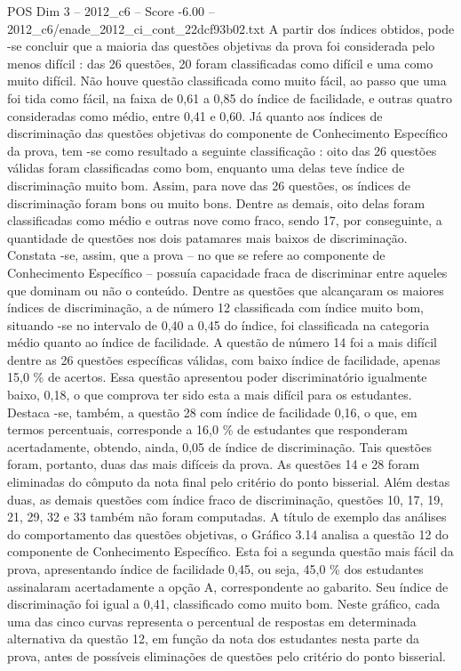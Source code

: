 \begin{textsample}{POS Dim 3 – 2012\_c6 – Score -6.00 – 2012\_c6/enade\_2012\_ci\_cont\_22dcf93b02.txt}
A partir dos índices obtidos, pode -se concluir que a maioria das questões objetivas da prova foi considerada pelo menos difícil : das 26 questões, 20 foram classificadas como difícil e uma como muito difícil.
Não houve questão classificada como muito fácil, ao passo que uma foi tida como fácil, na faixa de 0,61 a 0,85 do índice de facilidade, e outras quatro consideradas como médio, entre 0,41 e 0,60.
Já quanto aos índices de discriminação das questões objetivas do componente de Conhecimento Específico da prova, tem -se como resultado a seguinte classificação : oito das 26 questões válidas foram classificadas como bom, enquanto uma delas teve índice de discriminação muito bom.
Assim, para nove das 26 questões, os índices de discriminação foram bons ou muito bons.
Dentre as demais, oito delas foram classificadas como médio e outras nove como fraco, sendo 17, por conseguinte, a quantidade de questões nos dois patamares mais baixos de discriminação.
Constata -se, assim, que a prova – no que se refere ao componente de Conhecimento Específico – possuía capacidade fraca de discriminar entre aqueles que dominam ou não o conteúdo.
Dentre as questões que alcançaram os maiores índices de discriminação, a de número 12 classificada com índice muito bom, situando -se no intervalo de 0,40 a 0,45 do índice, foi classificada na categoria médio quanto ao índice de facilidade.
A questão de número 14 foi a mais difícil dentre as 26 questões específicas válidas, com baixo índice de facilidade, apenas 15,0 \% de acertos.
Essa questão apresentou poder discriminatório igualmente baixo, 0,18, o que comprova ter sido esta a mais difícil para os estudantes.
Destaca -se, também, a questão 28 com índice de facilidade 0,16, o que, em termos percentuais, corresponde a 16,0 \% de estudantes que responderam acertadamente, obtendo, ainda, 0,05 de índice de discriminação.
Tais questões foram, portanto, duas das mais difíceis da prova.
As questões 14 e 28 foram eliminadas do cômputo da nota final pelo critério do ponto bisserial.
Além destas duas, as demais questões com índice fraco de discriminação, questões 10, 17, 19, 21, 29, 32 e 33 também não foram computadas.
A título de exemplo das análises do comportamento das questões objetivas, o Gráfico 3.14 analisa a questão 12 do componente de Conhecimento Específico.
Esta foi a segunda questão mais fácil da prova, apresentando índice de facilidade 0,45, ou seja, 45,0 \% dos estudantes assinalaram acertadamente a opção A, correspondente ao gabarito.
Seu índice de discriminação foi igual a 0,41, classificado como muito bom.
Neste gráfico, cada uma das cinco curvas representa o percentual de respostas em determinada alternativa da questão 12, em função da nota dos estudantes nesta parte da prova, antes de possíveis eliminações de questões pelo critério do ponto bisserial.

\end{textsample}
